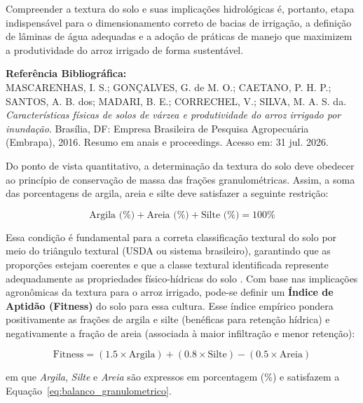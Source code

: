 \documentclass[12pt]{article}
\begin{document}
Compreender a textura do solo e suas implicações hidrológicas é, portanto, etapa indispensável para o dimensionamento correto de bacias de irrigação, a definição de lâminas de água adequadas e a adoção de práticas de manejo que maximizem a produtividade do arroz irrigado de forma sustentável.

\vspace{0.2cm}
\scriptsize
\textbf{Referência Bibliográfica:}\\
MASCARENHAS, I. S.; GONÇALVES, G. de M. O.; CAETANO, P. H. P.; SANTOS, A. B. dos; MADARI, B. E.; CORRECHEL, V.; SILVA, M. A. S. da. \textit{Características físicas de solos de várzea e produtividade do arroz irrigado por inundação}. Brasília, DF: Empresa Brasileira de Pesquisa Agropecuária (Embrapa), 2016. Resumo em anais e proceedings. Acesso em: 31 jul. 2026.

\vspace{1cm}
\noindent

Do ponto de vista quantitativo, a determinação da textura do solo deve obedecer ao princípio de conservação de massa das frações granulométricas. Assim, a soma das porcentagens de argila, areia e silte deve satisfazer a seguinte restrição:

\begin{equation}
\text{Argila (\%)} + \text{Areia (\%)} + \text{Silte (\%)} = 100\%
\label{eq:balanco_granulometrico}
\end{equation}

Essa condição é fundamental para a correta classificação textural do solo por meio do triângulo textural (USDA ou sistema brasileiro), garantindo que as proporções estejam coerentes e que a classe textural identificada represente adequadamente as propriedades físico-hídricas do solo . Com base nas implicações agronômicas da textura para o arroz irrigado, pode-se definir um \textbf{Índice de Aptidão (Fitness)} do solo para essa cultura. Esse índice empírico pondera positivamente as frações de argila e silte (benéficas para retenção hídrica) e negativamente a fração de areia (associada à maior infiltração e menor retenção):

\begin{equation}
\text{Fitness} = \left(1.5 \times \text{Argila}\right) + \left(0.8 \times \text{Silte}\right) - \left(0.5 \times \text{Areia}\right)
\label{eq:fitness}
\end{equation}

\noindent
em que \textit{Argila}, \textit{Silte} e \textit{Areia} são expressos em porcentagem (\%) e satisfazem a Equação~\ref{eq:balanco_granulometrico}.
\end{document}
